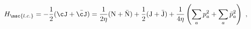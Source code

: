 \begin{equation}
H_{\msc{l.c.}} = -\frac{1}{2}(\cJ+\bar{\cJ}) 
  = \frac{1}{2\eta}(\mbox{N}+\bar{\mbox{N}}) 
  +\frac{1}{2} (\mbox{J}+\bar{\mbox{J}} ) 
+ \frac{1}{4\eta}\left(\sum_ap_a^2+\sum_a\bar{p}_a^2\right)  ~,
\label{spectrum3}
\end{equation}

